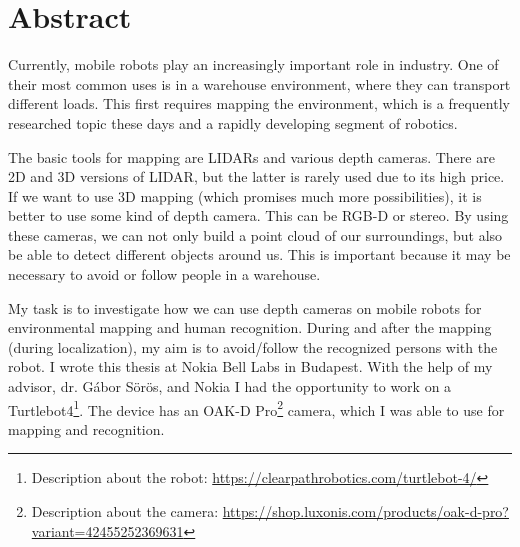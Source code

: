 \chapter*{Abstract}

Currently, mobile robots play an increasingly important role in industry\cite{MobRobots}. One of their most common uses is in a warehouse environment, where they can transport different loads. This first requires mapping the environment, which is a frequently researched topic these days and a rapidly developing segment of robotics.

The basic tools for mapping are LIDARs and various depth cameras. There are 2D and 3D versions of LIDAR, but the latter is rarely used due to its high price. If we want to use 3D mapping (which promises much more possibilities), it is better to use some kind of depth camera. This can be RGB-D\cite{RGB-D} or stereo\cite{Stereo}. By using these cameras, we can not only build a point cloud of our surroundings, but also be able to detect different objects around us. This is important because it may be necessary to avoid or follow people in a warehouse.

My task is to investigate how we can use depth cameras on mobile robots for environmental mapping and human recognition. During and after the mapping (during localization), my aim is to avoid/follow the recognized persons with the robot. I wrote this thesis at Nokia Bell Labs in Budapest. With the help of my advisor, dr. Gábor Sörös, and Nokia I had the opportunity to work on a Turtlebot4\footnote{Description about the robot: \url{https://clearpathrobotics.com/turtlebot-4/}}. The device has an OAK-D Pro\footnote{Description about the camera: \url{https://shop.luxonis.com/products/oak-d-pro?variant=42455252369631}} camera, which I was able to use for mapping and recognition.

\vfill
\selectthesislanguage

\setcounter{romanPage}{\value{page}}

